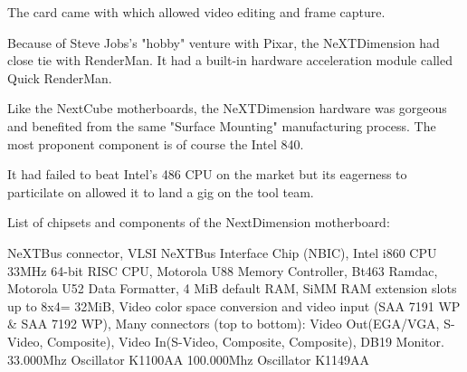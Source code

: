 \par
The card came with  which allowed video editing and frame capture.
\par
{}
\par
Because of Steve Jobs's "hobby" venture with Pixar, the NeXTDimension had close tie with RenderMan. It had a built-in hardware acceleration module called Quick RenderMan.\\
\par
\par






\par
Like the NextCube motherboards, the NeXTDimension hardware was gorgeous and benefited from the same "Surface Mounting" manufacturing process. The most proponent component is of course the Intel 840.\\
\par It had failed to beat Intel's 486 CPU on the market but its eagerness to particilate on \doom allowed it to land a gig on the tool team.\\
\par
{}
\par
List of chipsets and components of the NextDimension motherboard:\\
\par 
{} NeXTBus connector,
 VLSI NeXTBus Interface Chip (NBIC),
 Intel i860 CPU 33MHz 64-bit RISC CPU,
 Motorola U88 Memory Controller,
 Bt463 Ramdac,
 Motorola U52 Data Formatter,
 4 MiB default RAM,
 SiMM RAM extension slots up to 8x4= 32MiB,
 Video color space conversion and video input (SAA 7191 WP \& SAA 7192 WP), 
 Many connectors (top to bottom): Video Out(EGA/VGA, S-Video, Composite), Video In(S-Video, Composite, Composite), DB19 Monitor.
 33.000Mhz Oscillator K1100AA
 100.000Mhz Oscillator K1149AA
\par

